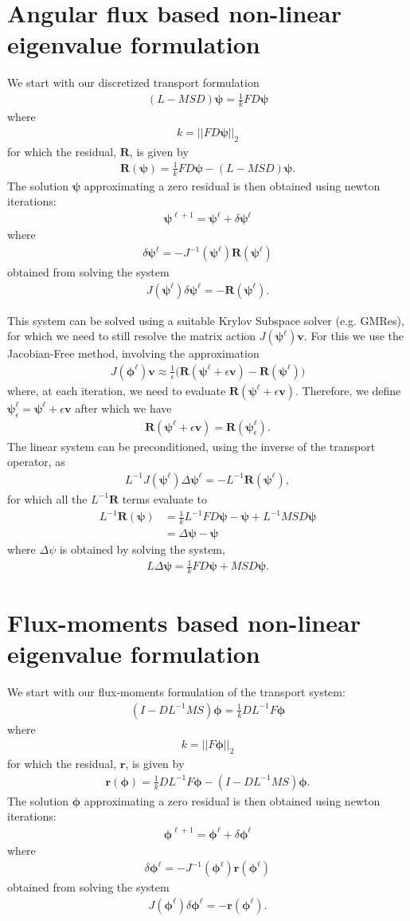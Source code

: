 \documentclass[11pt,letterpaper,notitlepage]{article}
\newcommand{\beqn}{\begin{equation}
		\begin{aligned}}
\newcommand{\eeqn}{\end{aligned}
\end{equation}}
\numberwithin{equation}{section}
\newcommand{\Linv}{L^{-1}}
\newcommand{\bphi}{\boldsymbol{\phi}}
\newcommand{\bpsi}{\boldsymbol{\psi}}
\newcommand{\br}{\mathbf{r}}
\newcommand{\bR}{\mathbf{R}}
\begin{document}
\newpage
{}
\section{Angular flux based non-linear eigenvalue formulation}
We start with our discretized transport formulation
\beqn 
(L - MSD)\bpsi = \frac{1}{k} FD\bpsi
\eeqn 
where
\beqn 
k = ||FD\bpsi ||_2
\eeqn 
for which the residual, $\bR$, is given by
\beqn 
\bR(\bpsi) = \frac{1}{k} FD\bpsi - (L - MSD)\bpsi.
\eeqn 
The solution $\bpsi$ approximating a zero residual is then obtained using newton iterations:
\beqn 
\bpsi^{\ell+1} = \bpsi^\ell + \delta \bpsi^\ell
\eeqn 
where
\beqn 
\delta \bpsi^\ell = -J^{-1}(\bpsi^\ell) \bR(\bpsi^\ell)
\eeqn 
obtained from solving the system
\beqn 
J(\bpsi^{\ell}) \delta \bpsi^{\ell} = -\bR(\bpsi^{\ell}).
\eeqn 

This system can be solved using a suitable Krylov Subspace solver (e.g. GMRes), for which we need to still resolve the matrix action $J(\bpsi^{\ell})\mathbf{v}$. For this we use the Jacobian-Free method, involving the approximation 
\beqn 
J(\bphi^{\ell})\mathbf{v} \approx \frac{1}{\epsilon} \biggr(\bR(\bpsi^\ell + \epsilon \mathbf{v}) - \bR(\bpsi^\ell)\biggr)
\eeqn 
where, at each iteration, we need to evaluate $\bR(\bpsi^\ell + \epsilon \mathbf{v})$. Therefore, we define $\bpsi_\epsilon^\ell = \bpsi^\ell + \epsilon \mathbf{v}$ after which we have
\beqn 
\bR(\bpsi^\ell + \epsilon \mathbf{v}) = \bR(\bpsi_\epsilon^\ell).
\eeqn 
\newline
\newline
The linear system can be preconditioned, using the inverse of the transport operator, as
\beqn 
\Linv J(\bpsi^{\ell}) \Delta \bpsi^{\ell} = -\Linv \bR(\bpsi^{\ell}),
\eeqn 
for which all the $\Linv \bR$ terms evaluate to
\beqn
\Linv \bR(\bpsi) &= \frac{1}{k} \Linv FD\bpsi - \bpsi + \Linv MSD\bpsi \\
&= \Delta \bpsi - \bpsi
\eeqn 
where $\Delta \psi$ is obtained by solving the system,
\beqn 
L\Delta \bpsi = \frac{1}{k} FD\bpsi + MSD\bpsi.
\eeqn 

\newpage
{}
\section{Flux-moments based non-linear eigenvalue formulation}
We start with our flux-moments formulation of the transport system:
\beqn 
(I-D\Linv MS) \bphi = \frac{1}{k} D\Linv F\bphi
\eeqn 
where 
\beqn 
k = ||F\bphi ||_2
\eeqn 
for which the residual, $\br$, is given by
\beqn 
\br(\bphi) = \frac{1}{k} D\Linv F\bphi - (I-D\Linv MS) \bphi.
\eeqn 
The solution $\bphi$ approximating a zero residual is then obtained using newton iterations:
\beqn 
\bphi^{\ell+1} = \bphi^{\ell}  + \delta \bphi^{\ell}
\eeqn
where
\beqn
\delta \bphi^{\ell} = - J^{-1}(\bphi^{\ell}) \br(\bphi^{\ell})
\eeqn 
obtained from solving the system
\beqn 
J(\bphi^{\ell}) \delta \bphi^{\ell} = -\br(\bphi^{\ell}).
\eeqn 
\end{document}
